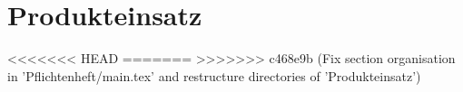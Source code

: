 \newpage
\section{Produkteinsatz}

<<<<<<< HEAD
=======
>>>>>>> c468e9b (Fix section organisation in 'Pflichtenheft/main.tex' and restructure directories of 'Produkteinsatz')



